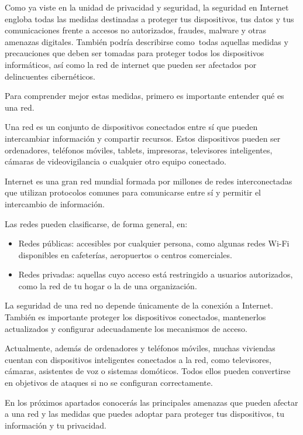 \documentclass[
  spanish,
  a4paper,
  openany]{book}
\begin{document}
Como ya viste en la unidad de privacidad y seguridad, la seguridad en Internet engloba todas las medidas destinadas a proteger tus dispositivos, tus datos y tus comunicaciones frente a accesos no autorizados, fraudes, malware y otras amenazas digitales. También podría describirse como~todas aquellas medidas y precauciones que deben ser tomadas para proteger todos los dispositivos informáticos, así como la red de internet que pueden ser afectados por delincuentes cibernéticos.

Para comprender mejor estas medidas, primero es importante entender qué es una red.

Una red es un conjunto de dispositivos conectados entre sí que pueden intercambiar información y compartir recursos. Estos dispositivos pueden ser ordenadores, teléfonos móviles, tablets, impresoras, televisores inteligentes, cámaras de videovigilancia o cualquier otro equipo conectado.

Internet es una gran red mundial formada por millones de redes interconectadas que utilizan protocolos comunes para comunicarse entre sí y permitir el intercambio de información.

Las redes pueden clasificarse, de forma general, en:

\begin{itemize}
\item
  Redes públicas: accesibles por cualquier persona, como algunas redes Wi-Fi disponibles en cafeterías, aeropuertos o centros comerciales.
\item
  Redes privadas: aquellas cuyo acceso está restringido a usuarios autorizados, como la red de tu hogar o la de una organización.
\end{itemize}

La seguridad de una red no depende únicamente de la conexión a Internet. También es importante proteger los dispositivos conectados, mantenerlos actualizados y configurar adecuadamente los mecanismos de acceso.

Actualmente, además de ordenadores y teléfonos móviles, muchas viviendas cuentan con dispositivos inteligentes conectados a la red, como televisores, cámaras, asistentes de voz o sistemas domóticos. Todos ellos pueden convertirse en objetivos de ataques si no se configuran correctamente.

En los próximos apartados conocerás las principales amenazas que pueden afectar a una red y las medidas que puedes adoptar para proteger tus dispositivos, tu información y tu privacidad.
\end{document}

